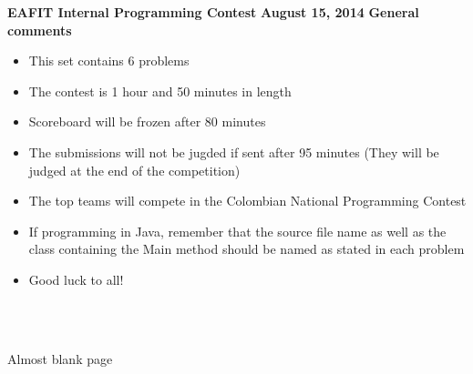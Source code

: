 \documentclass[12pt,letterpaper,oneside]{article}
\begin{document}
\thispagestyle{empty}
\begin{center}
	\LARGE\textbf{\center EAFIT Internal Programming Contest}
	\LARGE\textbf{\center August 15, 2014}
	\vspace*{\fill}
	\LARGE\textbf{\center General comments}
	\begin{itemize}
		\item This set contains 6 problems
		\item The contest is 1 hour and 50 minutes in length
                \item Scoreboard will be frozen after 80 minutes
                \item The submissions will not be jugded if sent after 95 minutes (They will be judged at the end of the competition)
		\item The top teams will compete in the Colombian National Programming Contest
		\item If programming in Java, remember that the source file name as well as the class containing the Main method should be named as stated in each problem
		\item Good luck to all!
	\end{itemize}
	\quad \\ \quad \\
	\vspace*{\fill}
\end{center}
\newpage

\thispagestyle{empty}
\vspace*{\fill}
\begin{center}
	\LARGE{Almost blank page}
\end{center}
\vspace*{\fill}
\newpage







\end{document}
